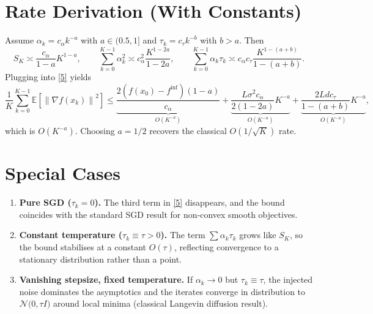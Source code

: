 \documentclass{article}
\newcommand{\E}{\mathbb{E}}
\newcommand{\norm}[1]{\left\|#1\right\|}
\begin{document}
\section*{Rate Derivation (With Constants)}
Assume $\alpha_{k}=c_{\alpha}k^{-a}$ with $a\in(0.5,1]$ and $\tau_{k}=c_{\tau}k^{-b}$ with $b>a$. Then
\[
S_{K}\asymp \frac{c_{\alpha}}{1-a}K^{1-a},\qquad
\sum_{k=0}^{K-1}\alpha_{k}^{2}\asymp c_{\alpha}^{2}\frac{K^{1-2a}}{1-2a},
\qquad
\sum_{k=0}^{K-1}\alpha_{k}\tau_{k}\asymp c_{\alpha}c_{\tau}\frac{K^{1-(a+b)}}{1-(a+b)}.
\]
Plugging into \eqref{5} yields
\[
\frac{1}{K}\sum_{k=0}^{K-1}\E\!\left[\norm{\nabla f(x_{k})}^{2}\right]
\le
\underbrace{\frac{2(f(x_{0})-f^{\inf})(1-a)}{c_{\alpha}}}_{\displaystyle O(K^{-a})}
+ \underbrace{\frac{L\sigma^{2}c_{\alpha}}{2(1-2a)}K^{-a}}_{\displaystyle O(K^{-a})}
+ \underbrace{\frac{2Ld c_{\tau}}{1-(a+b)}K^{-a}}_{\displaystyle O(K^{-a})},
\]
which is $O(K^{-a})$. Choosing $a=1/2$ recovers the classical $O(1/\sqrt{K})$ rate.

\section*{Special Cases}
\begin{enumerate}[nosep]
\item \textbf{Pure SGD ($\tau_{k}=0$).} The third term in \eqref{5} disappears, and the bound coincides with the standard SGD result for non‑convex smooth objectives.
\item \textbf{Constant temperature ($\tau_{k}\equiv\tau>0$).} The term $\sum\alpha_{k}\tau_{k}$ grows like $S_{K}$, so the bound stabilises at a constant $O(\tau)$, reflecting convergence to a stationary distribution rather than a point.
\item \textbf{Vanishing stepsize, fixed temperature.} If $\alpha_{k}\to0$ but $\tau_{k}\equiv\tau$, the injected noise dominates the asymptotics and the iterates converge in distribution to $\mathcal N\bigl(0, \tau I\bigr)$ around local minima (classical Langevin diffusion result).
\end{enumerate}
\end{document}
